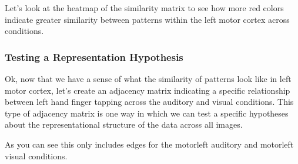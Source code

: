 \documentclass[letterpaper,10pt,english]{sphinxmanual}
\begin{document}
Let’s look at the heatmap of the similarity matrix to see how more red colors indicate greater similarity between patterns within the left motor cortex across conditions.

\begin{sphinxVerbatim}[commandchars=\\\{\}]
  
\PYG{p}{[}\PYG{p}{]}
  \PYG{p}{[}\PYG{p}{]}  
\end{sphinxVerbatim}

\noindent{}

\noindent{}


\subsubsection{Testing a Representation Hypothesis}
\label{\detokenize{content/RSA:testing-a-representation-hypothesis}}
Ok, now that we have a sense of what the similarity of patterns look like in left motor cortex, let’s create an adjacency matrix indicating a specific relationship between left hand finger tapping across the auditory and visual conditions. This type of adjacency matrix is one way in which we can test a specific hypotheses about the representational structure of the data across all images.

As you can see this only includes edges for the motor\sphinxhyphen{}left auditory and motor\sphinxhyphen{}left visual conditions.

\begin{sphinxVerbatim}[commandchars=\\\{\}]
  
\PYG{p}{[}\PYG{p}{]}   
\PYG{p}{[}\PYG{p}{]}  
\PYG{p}{[}\PYG{p}{]}  
\PYG{p}{[}\PYG{p}{]}  
\PYG{p}{[}\PYG{p}{]}  
    
\end{sphinxVerbatim}
\end{document}
